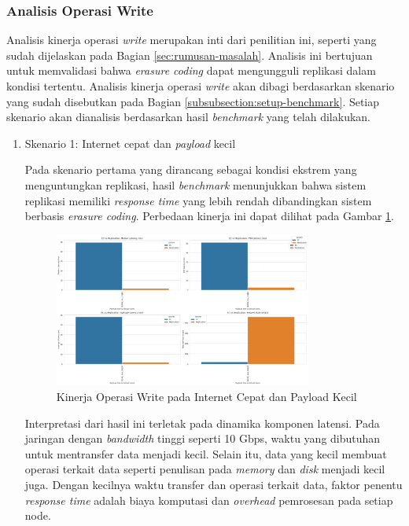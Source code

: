 \subsubsection{Analisis Operasi Write}
\label{subsubsection:analisis-operasi-write}

Analisis kinerja operasi \textit{write} merupakan inti dari penilitian ini, seperti yang sudah dijelaskan pada Bagian \ref{sec:rumusan-masalah}. Analisis ini bertujuan untuk memvalidasi bahwa \textit{erasure coding} dapat mengungguli replikasi dalam kondisi tertentu. Analisis kinerja operasi \textit{write} akan dibagi berdasarkan skenario yang sudah disebutkan pada Bagian \ref{subsubsection:setup-benchmark}. Setiap skenario akan dianalisis berdasarkan hasil \textit{benchmark} yang telah dilakukan.

\begin{enumerate}
  \item Skenario 1: Internet cepat dan \textit{payload} kecil

  Pada skenario pertama yang dirancang sebagai kondisi ekstrem yang menguntungkan replikasi, hasil \textit{benchmark} menunjukkan bahwa sistem replikasi memiliki \textit{response time} yang lebih rendah dibandingkan sistem berbasis \textit{erasure coding}. Perbedaan kinerja ini dapat dilihat pada Gambar \ref{fig:write-smload-fastnet}.

  \begin{figure}[ht]
      \centering
      \includegraphics[width=0.8\textwidth]{resources/chapter-4/write_smload_fastnet.png}

      \caption{Kinerja Operasi Write pada Internet Cepat dan Payload Kecil}
      \label{fig:write-smload-fastnet}
  \end{figure}
  
  Interpretasi dari hasil ini terletak pada dinamika komponen latensi. Pada jaringan dengan \textit{bandwidth} tinggi seperti 10 Gbps, waktu yang dibutuhan untuk mentransfer data menjadi kecil. Selain itu, data yang kecil membuat operasi terkait data seperti penulisan pada \textit{memory} dan \textit{disk} menjadi kecil juga. Dengan kecilnya waktu transfer dan operasi terkait data, faktor penentu \textit{response time} adalah biaya komputasi dan \textit{overhead} pemrosesan pada setiap node.


\end{enumerate}
